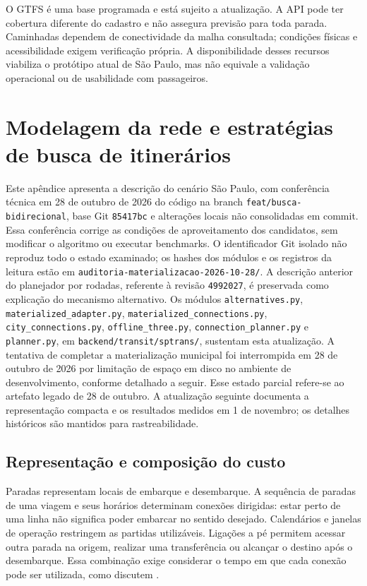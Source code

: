 \documentclass[12pt,oneside,a4paper,brazil,chapter=TITLE]{abntex2}
\let\papsection\section
\renewcommand{\section}{\clearpage\papsection}
\begin{document}
\begin{apendicesenv}
O GTFS é uma base programada e está sujeito a atualização. A API pode ter cobertura diferente do cadastro e não assegura previsão para toda parada. Caminhadas dependem de conectividade da malha consultada; condições físicas e acessibilidade exigem verificação própria. A disponibilidade desses recursos viabiliza o protótipo atual de São Paulo, mas não equivale a validação operacional ou de usabilidade com passageiros.



\chapter{Modelagem da rede e estratégias de busca de itinerários}
\label{ap:rotas}
Este apêndice apresenta a descrição do cenário São Paulo, com conferência técnica em 28 de outubro de 2026 do código na branch \nolinkurl{feat/busca-bidirecional}, base Git \texttt{85417bc} e alterações locais não consolidadas em commit. Essa conferência corrige as condições de aproveitamento dos candidatos, sem modificar o algoritmo ou executar benchmarks. O identificador Git isolado não reproduz todo o estado examinado; os hashes dos módulos e os registros da leitura estão em \nolinkurl{auditoria-materializacao-2026-10-28/}. A descrição anterior do planejador por rodadas, referente à revisão \texttt{4992027}, é preservada como explicação do mecanismo alternativo. Os módulos \nolinkurl{alternatives.py}, \nolinkurl{materialized_adapter.py}, \nolinkurl{materialized_connections.py}, \nolinkurl{city_connections.py}, \nolinkurl{offline_three.py}, \nolinkurl{connection_planner.py} e \nolinkurl{planner.py}, em \nolinkurl{backend/transit/sptrans/}, sustentam esta atualização. A tentativa de completar a materialização municipal foi interrompida em 28 de outubro de 2026 por limitação de espaço em disco no ambiente de desenvolvimento, conforme detalhado a seguir. Esse estado parcial refere-se ao artefato legado de 28 de outubro. A atualização seguinte documenta a representação compacta e os resultados medidos em 1 de novembro; os detalhes históricos são mantidos para rastreabilidade.





\section{Representação e composição do custo}
Paradas representam locais de embarque e desembarque. A sequência de paradas de uma viagem e seus horários determinam conexões dirigidas: estar perto de uma linha não significa poder embarcar no sentido desejado. Calendários e janelas de operação restringem as partidas utilizáveis. Ligações a pé permitem acessar outra parada na origem, realizar uma transferência ou alcançar o destino após o desembarque. Essa combinação exige considerar o tempo em que cada conexão pode ser utilizada, como discutem \citet{bast2015}.


\end{apendicesenv}
\end{document}
